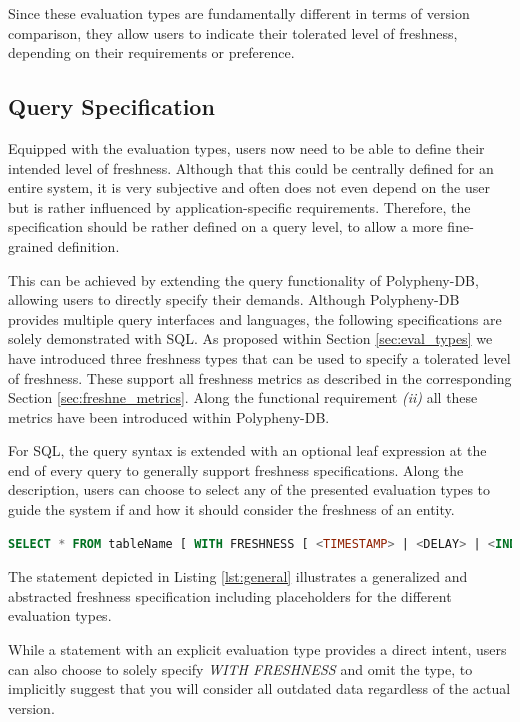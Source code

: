 Since these evaluation types are fundamentally different in terms of version comparison, they
allow users to indicate their tolerated level of freshness, depending on their requirements or preference. 



\subsection{Query Specification}
\label{sec:fresh_spec}

Equipped with the evaluation types, users now need to be able to define their intended level of freshness.
Although that this could be centrally defined for an entire system, it is very subjective and often does not even depend on the user
but is rather influenced by application-specific requirements.
Therefore, the specification should be rather defined on a query level, to allow a more fine-grained definition.

This can be achieved by extending the query functionality of Polypheny-DB, allowing users to directly specify their demands.
Although Polypheny-DB provides multiple query interfaces and languages, the following specifications are solely demonstrated with SQL. 
As proposed within Section \ref{sec:eval_types} we have introduced three freshness types that can be used to specify a tolerated level of freshness.
These support all freshness metrics as described in the corresponding Section \ref{sec:freshne_metrics}. Along the functional 
requirement \textit{(ii)} all these metrics have been introduced within Polypheny-DB.

For SQL, the query syntax is extended  with an optional leaf expression at the end of every query to generally support freshness specifications. 
Along the description, users can choose to select any of the presented evaluation types to guide the system if and how it should consider the freshness of an entity.
\begin{lstlisting}[language=sql, caption={Generalized Freshness Specification},label={lst:general}]
SELECT * FROM tableName [ WITH FRESHNESS [ <TIMESTAMP> | <DELAY> | <INDEX> ] ];
\end{lstlisting}

The statement depicted in Listing \ref{lst:general} illustrates a generalized and abstracted freshness specification including placeholders for the different evaluation types.

While a statement with an explicit evaluation type provides a direct intent, users can also choose to solely specify \emph{WITH FRESHNESS} 
and omit the type, to implicitly suggest that you will consider all outdated data regardless of the actual version.





